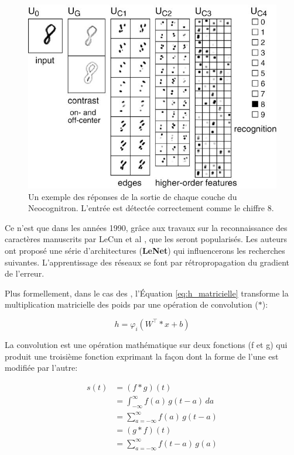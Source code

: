 \begin{figure}[!htbp] 
  \includegraphics[width=0.60\linewidth]{figures/neocognitron2.jpg}
  \centering
      \caption%
            {{\small Un exemple des réponses de la sortie de chaque couche du Neocognitron. L'entrée est détectée correctement comme le chiffre 8. \cite{Fukushima1980}}}    
            \label{fig:neocognitron-outputs-diagram}
\end{figure}


Ce n’est que dans les années 1990, grâce aux travaux sur la reconnaissance des caractères manuscrits par LeCun et al  \cite{LeCun1998}, que les \acrconvnet seront popularisés. Les auteurs ont proposé une série d'architectures (\textbf{LeNet}) qui influencerons les recherches suivantes.  L'apprentissage des réseaux se font par rétropropagation du gradient de l'erreur. 

Plus formellement, dans le cas des \acrconvnetns, l'Équation \ref{eq:h_matricielle} transforme la multiplication matricielle des poids par une opération de convolution ($\ast$):

 \begin{equation}
     h = \varphi_i(W^\intercal  \ast x + b)
     \label{eq:h_convolution}
 \end{equation}
 
\vspace{10pt}

 La convolution est une opération mathématique sur deux fonctions (f et g) qui produit une troisième fonction exprimant la façon dont la forme de l'une est modifiée par l'autre:
 
\begin{equation}
    \begin{split}
        s(t) & = (f \ast g)(t) \\ 
             & = \int_{- \infty}^{\infty} f(a)\,g(t-a)\,da \\
             & = \sum_{a=- \infty}^{\infty} f(a)\,g(t-a) \\
             & = (g \ast f)(t) \\
             & = \sum_{a=- \infty}^{\infty} f(t-a)\,g(a)
   \end{split}
\end{equation}

